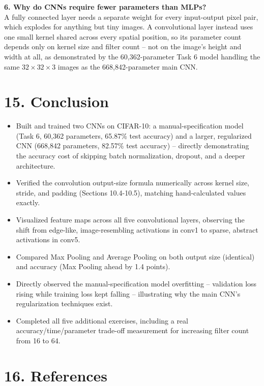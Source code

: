 \documentclass[11pt]{article}
\begin{document}
\textbf{6. Why do CNNs require fewer parameters than MLPs?}\\
A fully connected layer needs a separate weight for every input-output pixel pair, which explodes for anything but tiny images. A convolutional layer instead uses one small kernel shared across every spatial position, so its parameter count depends only on kernel size and filter count -- not on the image's height and width at all, as demonstrated by the 60,362-parameter Task 6 model handling the same $32\times32\times3$ images as the 668,842-parameter main CNN.


\section*{15. Conclusion}

\begin{itemize}[leftmargin=*]
\item Built and trained two CNNs on CIFAR-10: a manual-specification model (Task 6, 60,362 parameters, 65.87\% test accuracy) and a larger, regularized CNN (668,842 parameters, 82.57\% test accuracy) -- directly demonstrating the accuracy cost of skipping batch normalization, dropout, and a deeper architecture.
\item Verified the convolution output-size formula numerically across kernel size, stride, and padding (Sections 10.4-10.5), matching hand-calculated values exactly.
\item Visualized feature maps across all five convolutional layers, observing the shift from edge-like, image-resembling activations in conv1 to sparse, abstract activations in conv5.
\item Compared Max Pooling and Average Pooling on both output size (identical) and accuracy (Max Pooling ahead by 1.4 points).
\item Directly observed the manual-specification model overfitting -- validation loss rising while training loss kept falling -- illustrating why the main CNN's regularization techniques exist.
\item Completed all five additional exercises, including a real accuracy/time/parameter trade-off measurement for increasing filter count from 16 to 64.
\end{itemize}


\section*{16. References}
\end{document}
